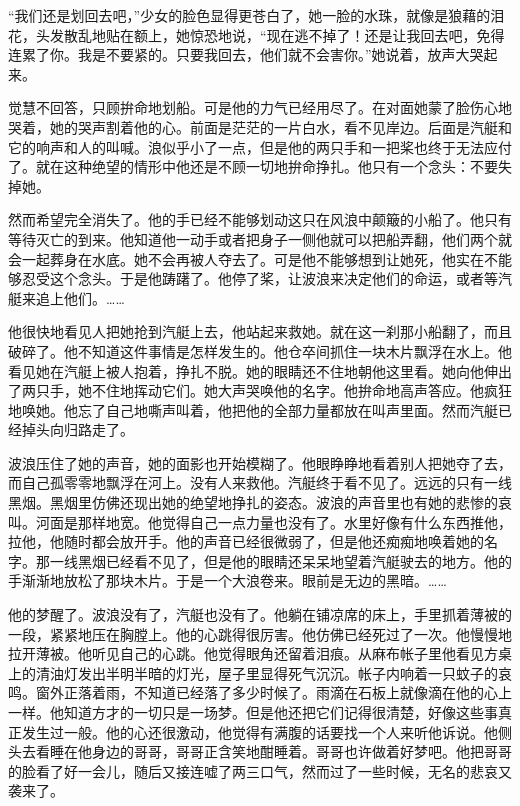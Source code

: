 \par “我们还是划回去吧，”少女的脸色显得更苍白了，她一脸的水珠，就像是狼藉的泪花，头发散乱地贴在额上，她惊恐地说，“现在逃不掉了！还是让我回去吧，免得连累了你。我是不要紧的。只要我回去，他们就不会害你。”她说着，放声大哭起来。
\par 觉慧不回答，只顾拚命地划船。可是他的力气已经用尽了。在对面她蒙了脸伤心地哭着，她的哭声割着他的心。前面是茫茫的一片白水，看不见岸边。后面是汽艇和它的响声和人的叫喊。浪似乎小了一点，但是他的两只手和一把桨也终于无法应付了。就在这种绝望的情形中他还是不顾一切地拚命挣扎。他只有一个念头：不要失掉她。
\par 然而希望完全消失了。他的手已经不能够划动这只在风浪中颠簸的小船了。他只有等待灭亡的到来。他知道他一动手或者把身子一侧他就可以把船弄翻，他们两个就会一起葬身在水底。她不会再被人夺去了。可是他不能够想到让她死，他实在不能够忍受这个念头。于是他踌躇了。他停了桨，让波浪来决定他们的命运，或者等汽艇来追上他们。……
\par 他很快地看见人把她抢到汽艇上去，他站起来救她。就在这一刹那小船翻了，而且破碎了。他不知道这件事情是怎样发生的。他仓卒间抓住一块木片飘浮在水上。他看见她在汽艇上被人抱着，挣扎不脱。她的眼睛还不住地朝他这里看。她向他伸出了两只手，她不住地挥动它们。她大声哭唤他的名字。他拚命地高声答应。他疯狂地唤她。他忘了自己地嘶声叫着，他把他的全部力量都放在叫声里面。然而汽艇已经掉头向归路走了。
\par 波浪压住了她的声音，她的面影也开始模糊了。他眼睁睁地看着别人把她夺了去，而自己孤零零地飘浮在河上。没有人来救他。汽艇终于看不见了。远远的只有一线黑烟。黑烟里仿佛还现出她的绝望地挣扎的姿态。波浪的声音里也有她的悲惨的哀叫。河面是那样地宽。他觉得自己一点力量也没有了。水里好像有什么东西推他，拉他，他随时都会放开手。他的声音已经很微弱了，但是他还痴痴地唤着她的名字。那一线黑烟已经看不见了，但是他的眼睛还呆呆地望着汽艇驶去的地方。他的手渐渐地放松了那块木片。于是一个大浪卷来。眼前是无边的黑暗。……
\par 他的梦醒了。波浪没有了，汽艇也没有了。他躺在铺凉席的床上，手里抓着薄被的一段，紧紧地压在胸膛上。他的心跳得很厉害。他仿佛已经死过了一次。他慢慢地拉开薄被。他听见自己的心跳。他觉得眼角还留着泪痕。从麻布帐子里他看见方桌上的清油灯发出半明半暗的灯光，屋子里显得死气沉沉。帐子内响着一只蚊子的哀鸣。窗外正落着雨，不知道已经落了多少时候了。雨滴在石板上就像滴在他的心上一样。他知道方才的一切只是一场梦。但是他还把它们记得很清楚，好像这些事真正发生过一般。他的心还很激动，他觉得有满腹的话要找一个人来听他诉说。他侧头去看睡在他身边的哥哥，哥哥正含笑地酣睡着。哥哥也许做着好梦吧。他把哥哥的脸看了好一会儿，随后又接连嘘了两三口气，然而过了一些时候，无名的悲哀又袭来了。



